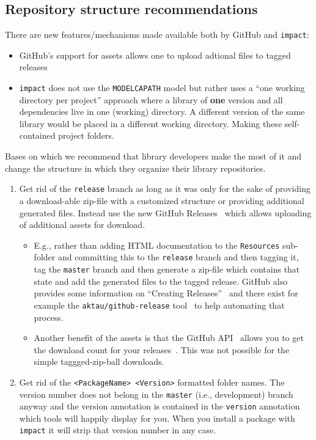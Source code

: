 \documentclass[11pt,a4paper,twocolumn]{article}
\newcommand{\code}[1]{\texttt{#1}} %
\begin{document}
\subsection{Repository structure recommendations}
There are new features/mechanisms made available both by GitHub and
\code{impact}:
\begin{itemize}
\item GitHub's support for assets \parencite{gh-assets} allows one to
  upload adtional files to tagged releases
\item  \code{impact} does not use the \texttt{MODELCAPATH} model but
  rather uses a ``one working directory per project'' approach where a
  library of \textbf{one} version  and all dependencies live in one
  (working) directory. A different version of the same library would
  be placed in a different working directory.
  Making these self-contained project folders.
\end{itemize}

Bases on which we recommend that library developers make the most of
it and change the structure in which they organize their library repositories.
\begin{enumerate}
\item Get rid of the \texttt{release} branch as long as it was only
  for the sake of providing a download-able zip-file with a customized
  structure or providing additional generated files.
  Instead use the new GitHub Releases~\parencite{gh-assets} which
  allows uploading of additional assets for download.
  \begin{itemize}
  \item E.g., rather than adding HTML documentation to the
    \texttt{Resources} sub-folder and committing this to the
    \texttt{release} branch and then tagging it, tag the
    \texttt{master} branch and then generate a zip-file which contains
    that state and add the generated files to the tagged release.
    GitHub also provides some information on ``Creating
    Releases''~\parencite{gh-releases} and there exist for example the
    \texttt{aktau/github-release} tool~\parencite{aktau-github-release}
    to help automating that process.
  \item Another benefit of  the assets is that the GitHub
    API~\parencite{gh-api} allows you to get the download count for
    your releases~\parencite{gh-dl-count}.
    This was not possible for the simple taggged-zip-ball downloads.
  \end{itemize}
\item Get rid of the \texttt{<PackageName> <Version>} formatted folder
  names. The version number does not belong in the  \texttt{master}
  (i.e., development)  branch anyway and the version annotation is
  contained  in the \texttt{version} annotation which tools will happily
  display for you. When you install a package with \code{impact} it
  will strip that version number in any case.
\end{enumerate}
\end{document}
